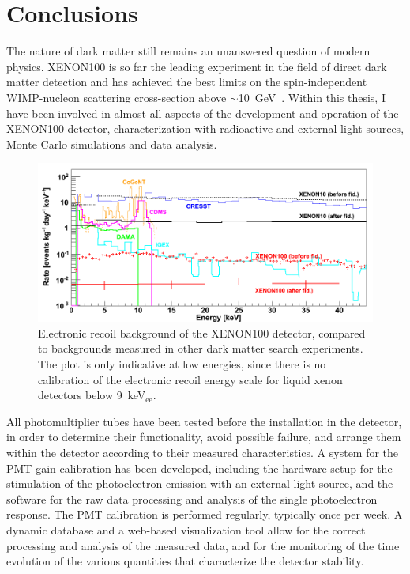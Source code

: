 \chapter{Conclusions}
\label{chConclusions}

The nature of dark matter still remains an unanswered question of modern physics. XENON100 is so far the leading experiment in the field of direct dark matter detection and has achieved the best limits on the spin-independent WIMP-nucleon scattering cross-section above $\sim$10~GeV~\cite{xe100-run08}.
Within this thesis, I have been involved in almost all aspects of the development and operation of the XENON100 detector, characterization with radioactive and external light sources, Monte Carlo simulations and data analysis.

\begin{figure}[!b]
\centering
\includegraphics[width=1.0\linewidth]{plots/Xe1T/comparison_withLabels_wide.png}
\caption[Electronic recoil background of the XENON100 detector, compared to backgrounds measured in other dark matter search experiments]{Electronic recoil background of the XENON100 detector, compared to backgrounds measured in other dark matter search experiments. The plot is only indicative at low energies, since there is no calibration of the electronic recoil energy scale for liquid xenon detectors below 9~keV$_{\mathrm{ee}}$.}
\label{figXe100_BGcomparison}
\end{figure}

All photomultiplier tubes have been tested before the installation in the detector, in order to determine their functionality, avoid possible failure, and arrange them within the detector according to their measured characteristics. A system for the PMT gain calibration has been developed, including the hardware setup for the stimulation of the photoelectron emission with an external light source, and the software for the raw data processing and analysis of the single photoelectron response. The PMT calibration is performed regularly, typically once per week. A dynamic database and a web-based visualization tool allow for the correct processing and analysis of the measured data, and for the monitoring of the time evolution of the various quantities that characterize the detector stability.

